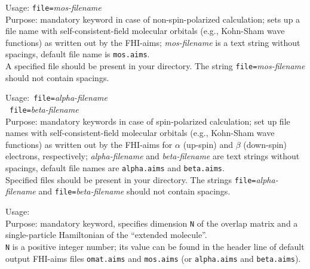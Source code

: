 
{
 \noindent 
 Usage: \quad \texttt{file=}\textit{mos-filename} \\[1.0ex] 
 Purpose: mandatory keyword in case of non-spin-polarized calculation; 
 sets up a file name with
 self-consistent-field molecular orbitals (e.g., Kohn-Sham wave functions)
 as written out by the FHI-aims; \textit{mos-filename} is a text string
 without spacings, default file name is \texttt{mos.aims}. \\
}
A specified file should be present in your directory.  The string
\mbox{\texttt{file=}\textit{mos-filename}} should not contain spacings.


{
 Usage:\  \quad \texttt{file=}\textit{alpha-filename} \\
 \phantom{Usage:}\ 
 \phantom{a}\quad \texttt{file=}\textit{beta-filename} \\[1.0ex] 
 Purpose: mandatory keywords in case of spin-polarized calculation; set up 
 file names with self-consistent-field molecular orbitals (e.g., Kohn-Sham 
 wave functions) as written out by the FHI-aims for $\alpha$ (up-spin) and
 $\beta$ (down-spin) electrons, respectively; \textit{alpha-filename} and 
 \textit{beta-filename} are text strings without spacings, default file 
 names are \texttt{alpha.aims} and \texttt{beta.aims}. \\
}
Specified files should be present in your directory.
The strings \mbox{\texttt{file=}\textit{alpha-filename}} and
\mbox{\texttt{file=}\textit{beta-filename}} should not contain spacings.


{
 \noindent 
 Usage: \quad {} \\[1.0ex] 
 Purpose: mandatory keyword, specifies dimension \texttt{N} of the overlap 
 matrix and a single-particle Hamiltonian of the ``extended molecule''. \\[1.0ex]
 \texttt{N} is a positive integer number; its value can be found in
 the header line of default output FHI-aims files \texttt{omat.aims}
 and \texttt{mos.aims} (or \texttt{alpha.aims} and \texttt{beta.aims}). \\
}


